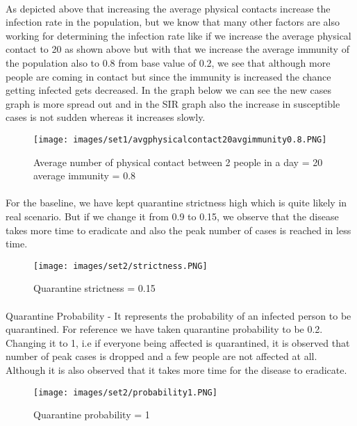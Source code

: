 \documentclass[12pt, a4paper]{extarticle}
\begin{document}
    \newpage
    \paragraph{}
    As depicted above that increasing the average physical contacts increase the infection rate in the population, but we know that many other factors are also working for determining the infection rate like if we increase the average physical contact to 20 as shown above but with that we increase the average immunity of the population also to 0.8 from base value of 0.2, we see that although more people are coming in contact but since the immunity is increased the chance getting infected gets decreased.
    In the graph below we can see the new cases graph is more spread out and in the SIR graph also the increase in susceptible cases is not sudden whereas it increases slowly.
    \vspace{0.2in}
    \begin{figure}[h]
        \centering
        \texttt{[image: images/set1/avgphysicalcontact20avgimmunity0.8.PNG]}
        \caption{Average number of physical contact between 2 people in a day = 20 average immunity = 0.8}
    \end{figure}
    
    \newpage
    \paragraph{} For the baseline, we have kept quarantine strictness high which is quite likely in real scenario. But if we change it from 0.9 to 0.15, we observe that the disease takes more time to eradicate and also the peak number of cases is reached in less time.
    \vspace{0.2in}
    \begin{figure}[h!]
        \centering
        \texttt{[image: images/set2/strictness.PNG]}
        \caption{Quarantine strictness = 0.15}
    \end{figure}
    
    \newpage
    \paragraph{} 
    Quarantine Probability - It represents the probability of an infected person to be quarantined.
    For reference we have taken quarantine probability to be 0.2.
    Changing it to 1, i.e if everyone being affected is quarantined, it is observed that number of peak cases is dropped and a few people are not affected at all. Although it is also observed that it takes more time for the disease to eradicate.
    \vspace{0.2in}
    \begin{figure}[h]
        \centering
        \texttt{[image: images/set2/probability1.PNG]}
        \caption{Quarantine probability = 1}
    \end{figure}
    
\end{document}
